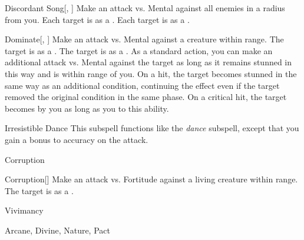 \begin{ability}[\nth{4}]{Discordant Song}[, ]
Make an attack vs. Mental against all enemies in a \areamed radius from you.
\hit Each target is \disoriented as a .
\crit Each target is \confused as a .
\end{ability}
\vspace{0.25em}


\begin{ability}[\nth{4}]{Dominate}[, ]
Make an attack vs. Mental against a creature within \rngmed range.
\hit The target is  as a .
\crit The target is  as a .
As a standard action, you can make an additional attack vs. Mental against the target as long as it remains stunned in this way and is within \rngmed range of you.
On a hit, the target becomes stunned in the same way as an additional condition, continuing the effect even if the target removed the original condition in the same phase.
On a critical hit, the target becomes  by you as long as you  to this ability.
\end{ability}
\vspace{0.25em}


\begin{ability}[\nth{6}]{Irresistible Dance}
This subspell functions like the \textit{dance} subspell, except that you gain a  bonus to accuracy on the attack.
\end{ability}
\vspace{0.25em}

\newpage
\begin{spellsection}{Corruption}

\begin{spellheader}
\end{spellheader}


\begin{ability}{Corruption}[]
Make an attack vs. Fortitude against a living creature within \rngclose range.
\hit The target is  as a .
\end{ability}




 Vivimancy

 Arcane, Divine, Nature, Pact
\end{spellsection}


